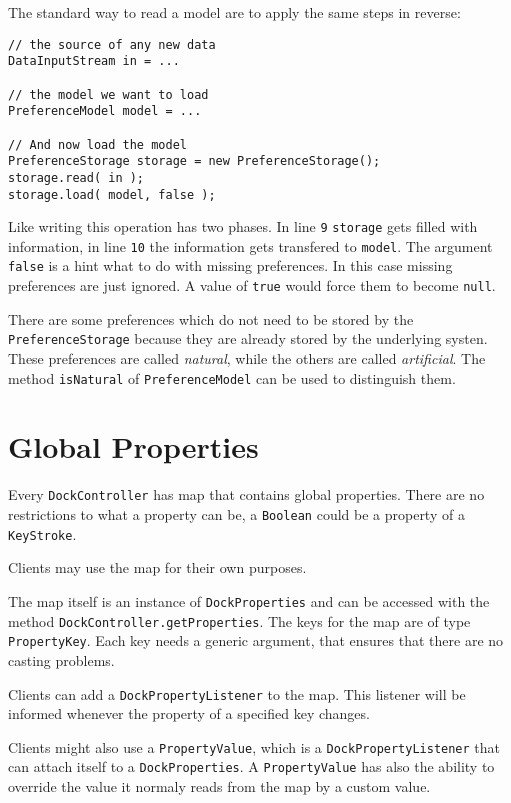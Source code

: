 \documentclass[a4paper,10pt]{article}
\newcommand{\src}[1]{\lstinline[basicstyle=\normalsize\ttfamily,keywordstyle=\normalsize\ttfamily,identifierstyle=\normalsize\ttfamily]|#1|}
\begin{document}
The standard way to read a model are to apply the same steps in reverse:
\begin{lstlisting}
// the source of any new data
DataInputStream in = ...

// the model we want to load
PreferenceModel model = ...

// And now load the model
PreferenceStorage storage = new PreferenceStorage();
storage.read( in );
storage.load( model, false );
\end{lstlisting}
Like writing this operation has two phases. In line \src{9} \src{storage} gets filled with information, in line \src{10} the information gets transfered to \src{model}. The argument \src{false} is a hint what to do with missing preferences. In this case missing preferences are just ignored. A value of \src{true} would force them to become \src{null}.

There are some preferences which do not need to be stored by the \\\src{PreferenceStorage} because they are already stored by the underlying systen. These preferences are called \textit{natural}, while the others are called \textit{artificial}. The method \src{isNatural} of \src{PreferenceModel} can be used to distinguish them.


\section{Global Properties}
Every \src{DockController} has map that contains global properties. There are no restrictions to what a property can be, a \src{Boolean} could be a property of a \src{KeyStroke}. 

Clients may use the map for their own purposes.

The map itself is an instance of \src{DockProperties} and can be accessed with the method \src{DockController.getProperties}. The keys for the map are of type \\\src{PropertyKey}. Each key needs a generic argument, that ensures that there are no casting problems.

Clients can add a \src{DockPropertyListener} to the map. This listener will be informed whenever the property of a specified key changes.

Clients might also use a \src{PropertyValue}, which is a \src{DockPropertyListener} that can attach itself to a \src{DockProperties}. A \src{PropertyValue} has also the ability to override the value it normaly reads from the map by a custom value.
\end{document}
